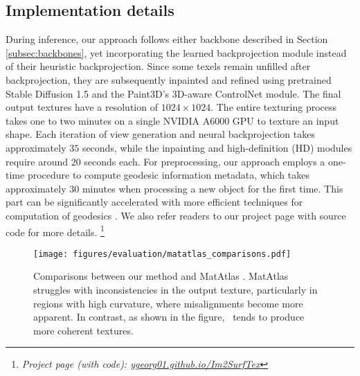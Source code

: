 \subsection{Implementation details} 
During inference, our approach follows either backbone described in Section \ref{subsec:backbones}, yet 
incorporating the learned backprojection module instead of their heuristic backprojection. Since some 
texels remain unfilled after backprojection, they are subsequently inpainted and refined using 
pretrained Stable Diffusion 1.5 and the Paint3D's 3D-aware ControlNet module. The final output textures 
have a resolution of $1024\times1024$. The entire texturing process takes one to two minutes on a single 
NVIDIA A6000 GPU to texture an input shape. Each iteration of view generation and neural backprojection 
takes approximately $35$ seconds, while the inpainting and high-definition (HD) modules require around 
$20$ seconds each. For preprocessing, our approach employs a one-time procedure to compute geodesic 
information metadata, which takes approximately $30$ minutes when processing a new object for the first 
time. This part can be significantly accelerated with more efficient techniques for computation of 
geodesics \cite{Crane:2013:Heat,Zhang:2023:NeuroGF}. We also refer readers to our project page with 
source code for more details. \footnote{\emph{Project page (with code): 
\href{https://ygeorg01.github.io/Im2SurfTex/}{ygeorg01.github.io/Im2SurfTex}}} 

\begin{figure*}[!t]
    \texttt{[image: figures/evaluation/matatlas\_comparisons.pdf]}
    \vspace*{-5mm}
    \caption{Comparisons between our method and MatAtlas \cite{Ceylan:2024:Matatlas}. MatAtlas struggles with
    inconsistencies in the output texture, particularly in regions with high curvature, where misalignments 
    become more apparent. In contrast, as shown in the figure, \method\, tends to produce more coherent 
    textures.}
    \label{fig:matatlas_comparison}
    \vspace*{-5mm}
\end{figure*}

